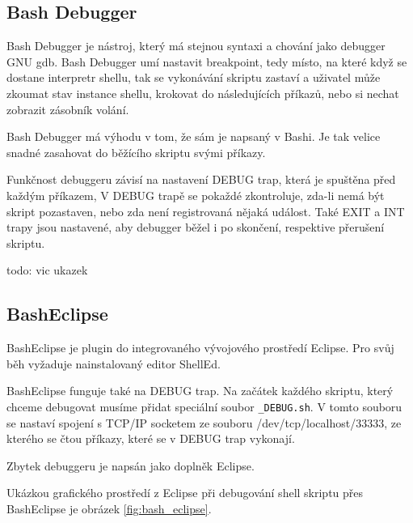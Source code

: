 \documentclass[thesis=M,czech]{FITthesis}[2012/06/26]
\begin{document}
\subsection{Bash Debugger}

Bash Debugger je nástroj, který má stejnou syntaxi a chování jako debugger GNU gdb. Bash Debugger umí nastavit breakpoint, tedy místo, na které když se dostane interpretr shellu, tak se vykonávání skriptu zastaví a uživatel může zkoumat stav instance shellu, krokovat do následujících příkazů, nebo si nechat zobrazit zásobník volání.

Bash Debugger má výhodu v tom, že sám je napsaný v Bashi. Je tak velice snadné zasahovat do běžícího skriptu svými příkazy.

Funkčnost debuggeru závisí na nastavení DEBUG trap, která je spuštěna před každým příkazem, V DEBUG trapě se pokaždé zkontroluje, zda-li nemá být skript pozastaven, nebo zda není registrovaná nějaká událost. Také EXIT a INT trapy jsou nastavené, aby debugger běžel i po skončení, respektive přerušení skriptu.

todo: vic ukazek



\subsection{BashEclipse}

BashEclipse je plugin do integrovaného vývojového prostředí Eclipse. Pro svůj běh vyžaduje nainstalovaný editor ShellEd.

BashEclipse funguje také na DEBUG trap. Na začátek každého skriptu, který chceme debugovat musíme přidat speciální soubor \texttt{\_DEBUG.sh}. V tomto souboru se nastaví spojení s TCP/IP socketem ze souboru /dev/tcp/localhost/33333, ze kterého se čtou příkazy, které se v DEBUG trap vykonají.

Zbytek debuggeru je napsán jako doplněk Eclipse.

Ukázkou grafického prostředí z Eclipse při debugování shell skriptu přes BashEclipse je obrázek \ref{fig:bash_eclipse}.
\end{document}
